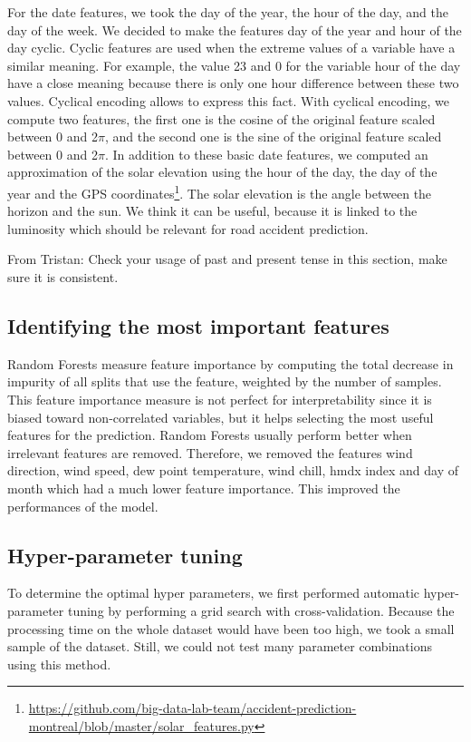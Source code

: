 \documentclass[conference]{IEEEtran}
\newcommand{\TG}[1]{\colorlet{saved}{.}\color{orange}From Tristan: #1\color{saved}}
\begin{document}
For the date features, we took the day of the year, the hour of the day,
and the day of the week. We decided to make the features day of the year
and hour of the day cyclic. Cyclic features are used when the extreme values
of a variable have a similar meaning. For example, the value 23 and 0 for
the variable hour of the day have a close meaning because there is only one
hour difference between these two values. Cyclical encoding allows to express
this fact. With cyclical encoding, we compute two features, the first one is
the cosine of the original feature scaled between 0 and 2$\pi$, and the second
one is the sine of the original feature scaled between 0 and 2$\pi$.
In addition to these basic date features, we computed an approximation
of the solar elevation using the hour of the day, the day of the year
and the GPS coordinates\footnote{\url{https://github.com/big-data-lab-team/accident-prediction-montreal/blob/master/solar\_features.py}}. The solar elevation is the angle 
between the horizon and the sun. We think it can be useful, because it is
linked to the luminosity which should be relevant for road accident prediction.

\TG{Check your usage of past and present tense in this section, make sure it is consistent.}

\subsection{Identifying the most important features}

Random Forests measure feature importance by computing the total
decrease in impurity of all splits that use the feature, weighted by the
number of samples. This feature importance measure is not perfect for
interpretability since it is biased toward non-correlated variables, but it
helps selecting the most useful features for the prediction. 
Random Forests usually perform better when irrelevant features are removed.
Therefore, we removed the features wind direction, wind speed, dew
point temperature, wind chill, hmdx index and day of month which had a
much lower feature importance. This improved the performances of the model.

\subsection{Hyper-parameter tuning}

To determine the optimal hyper parameters, we first performed
automatic hyper-parameter tuning by performing a grid search 
with cross-validation. Because the processing time on the whole dataset would
have been too high, we took a small sample of the dataset. Still, we could
not test many parameter combinations using this method.
\end{document}
